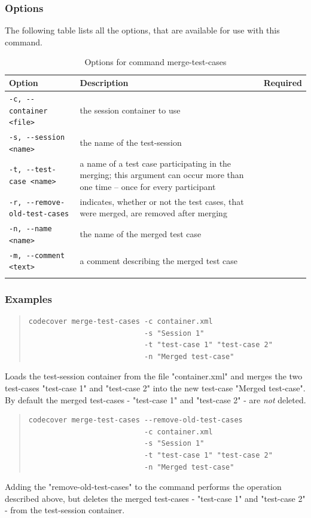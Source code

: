 \subsubsection{Options}\label{command:mt:options}
The following table lists all the options, that are available for use with this command.
\begin{longtable}{|l|p{4cm}|c|}\hline
   {\textbf{Option}} & 
   {\textbf{Description}} & 
   {\textbf{Required}} \\\hline \hline \endhead
   \verb$-c, --container <file>$ & the session container to use & \x \\\hline
   \verb$-s, --session <name>$ & the name of the test-session & \x \\\hline
   \verb$-t, --test-case <name>$ & a name of a test case participating in the merging; this argument can occur more than one time -- once for every participant & \x \\\hline
   \verb$-r, --remove-old-test-cases$ & indicates, whether or not the test cases, that were merged, are removed after merging & \\\hline
   \verb$-n, --name <name>$ & the name of the merged test case & \x \\\hline
   \verb$-m, --comment <text>$ & a comment describing the merged test case & \\\hline
  \caption{Options for command merge-test-cases}
  \label{fr_tb:Options for command merge-test-cases}
\end{longtable}

\subsubsection{Examples}\label{command:mt:examples}
\begin{quote}
\begin{verbatim}
codecover merge-test-cases -c container.xml 
                           -s "Session 1"
                           -t "test-case 1" "test-case 2" 
                           -n "Merged test-case"
\end{verbatim}
\end{quote}
Loads the test-session container from the file "container.xml" and merges the two test-cases "test-case 1" and "test-case 2" into the new test-case "Merged test-case". By default the merged test-cases - "test-case 1" and "test-case 2" - are \emph{not} deleted.
\begin{quote}
\begin{verbatim}
codecover merge-test-cases --remove-old-test-cases 
                           -c container.xml 
                           -s "Session 1"
                           -t "test-case 1" "test-case 2" 
                           -n "Merged test-case"
\end{verbatim}
\end{quote}
Adding the "remove-old-test-cases" to the command performs the operation described above, but deletes the merged test-cases - "test-case 1" and "test-case 2" - from the test-session container.

